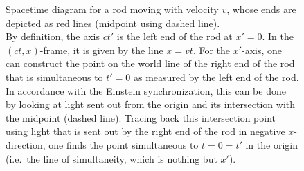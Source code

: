 \begin{figure}
	\centering



		\caption{Spacetime diagram for a rod moving with velocity $v$, whose ends are depicted as red lines (midpoint using dashed line).\\
		By definition, the axis $ct'$ is the left end of the rod at $x' = 0$. In the $(ct, x)$-frame, it is given by the line $x = vt$. For the $x'$-axis, one can construct the point on the world line of the right end of the rod that is simultaneous to $t' = 0$ as measured by the left end of the rod. In accordance with the Einstein synchronization, this can be done by looking at light sent out from the origin and its intersection with the midpoint (dashed line). Tracing back this intersection point using light that is sent out by the right end of the rod in negative $x$-direction, one finds the point simultaneous to $t = 0 = t'$ in the origin (i.e.~the line of simultaneity, which is nothing but $x'$).}
		\label{fig:moving_rod_diagram}
\end{figure}






